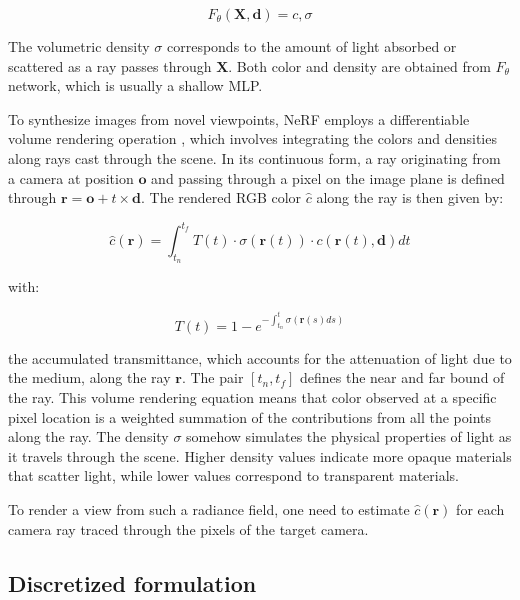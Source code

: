 \begin{equation}
  F_{\theta}(\mathbf{X},\mathbf{d}) = c,\sigma
\end{equation}

The volumetric density $\sigma$ corresponds to the amount of light absorbed or scattered as a ray passes through $\mathbf{X}$. Both color and density are obtained from $F_{\theta}$ network, which is usually a shallow \ac{MLP}.

To synthesize images from novel viewpoints, \ac{NeRF} employs a differentiable volume rendering operation \citep{max1995optical}, which involves integrating the colors and densities along rays cast through the scene. In its continuous form, a ray originating from a camera at position \(\mathbf{o}\) and passing through a pixel on the image plane is defined through $\mathbf{r} = \textbf{o} + t\times \mathbf{d}$. The rendered RGB color $\hat{c}$ along the ray is then given by: 

\begin{equation}
  \label{eq:vr-nerf}
  \hat{c}(\mathbf{r}) = \int_{t_n}^{t_f} T(t) \cdot \sigma(\mathbf{r}(t)) \cdot c(\mathbf{r}(t),\mathbf{d}) dt
\end{equation}

with: 

\begin{equation}
  T(t) = 1 - e^{-\int_{t_n}^{t}\sigma(\mathbf{r}(s)ds)}
\end{equation}

the accumulated transmittance, which accounts for the attenuation of light due to the medium, along the ray $\mathbf{r}$.  The pair $[t_{n},t_{f}]$ defines the near and far bound of the ray. This volume rendering equation means that color observed at a specific pixel location is a weighted summation of the contributions from all the points along the ray. The density $\sigma$ somehow simulates the physical properties of light as it travels through the scene. Higher density values indicate more opaque materials that scatter light, while lower values correspond to transparent materials.  

To render a view from such a radiance field, one need to estimate $\hat{c}(\mathbf{r})$ for each camera ray traced through the pixels of the target camera. 

\subsection{Discretized formulation}

